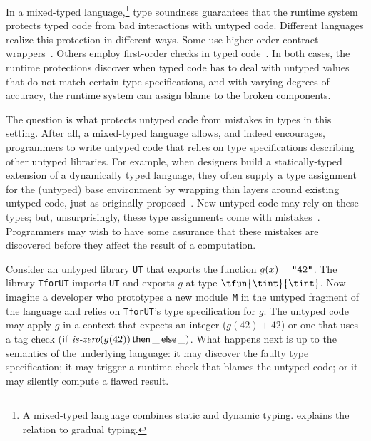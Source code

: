 \def\fourty{\mbox{\tt "42"}}

In a mixed-typed language,\footnote{A mixed-typed language combines static and
 dynamic typing.  explains the relation to gradual typing.}
type soundness guarantees that the runtime system
protects typed code from bad interactions with untyped code.
Different languages realize this protection in different ways.
Some use higher-order contract wrappers~\cite{tf-popl-2008}.
Others employ first-order checks in typed
code~\cite{vss-popl-2017,v-thesis-2019,rmhn-ecoop-2019}.
In both cases, the runtime protections discover when typed code has to deal
with untyped values that do not match certain type specifications, and with
varying degrees of accuracy, the runtime system can assign blame to the broken
components.

The question is what protects untyped code from mistakes in types in this
setting. After all, a mixed-typed language allows, and indeed encourages,
programmers to write untyped code that relies on type specifications describing
other untyped libraries.
For example, when designers build a statically-typed extension of a dynamically
typed language, they often supply a type assignment for the (untyped) base
environment by wrapping thin layers around existing untyped code, just as
originally proposed~\cite{tf-dls-2006}.
New untyped code may rely on these types; but, unsurprisingly,
these type assignments come with mistakes~\cite{incorrect-ts, sta-nt-base-types}.
Programmers may wish to have some assurance that these mistakes are discovered
before they affect the result of a computation.

Consider an untyped library {\tt UT} that exports the function $g(x) =
\fourty$. The library {\tt TforUT} imports {\tt UT} and exports $g$ at type
$\tfun{\tint}{\tint}$. Now imagine a developer who prototypes a new
module~{\tt M} in the untyped fragment of the language and relies on
{\tt TforUT}'s type specification for $g$.
The untyped code may apply $g$ in a context
that expects an integer ($g(42) + 42$)
or one that uses a tag check ($\mathsf{if}~\emph{is-zero}(g(42))\,\mathsf{then}\,{\tt \_}\,\mathsf{else}\,{\tt \_})$.
What happens next is up to the semantics of the underlying
language: it may discover the faulty type specification; it may trigger a
runtime check that blames the untyped code; or it may silently
compute a flawed result.

